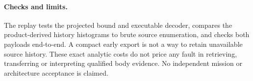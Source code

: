\documentclass{article}
\begin{document}
\paragraph{Checks and limits.}
The replay tests the projected bound and executable decoder, compares
the product-derived history histograms to brute source enumeration,
and checks both payloads end-to-end. A compact early export is not a
way to retain unavailable source history. These exact analytic costs
do not price any fault in retrieving, transferring or interpreting
qualified body evidence. No independent mission or architecture
acceptance is claimed.
\end{document}
